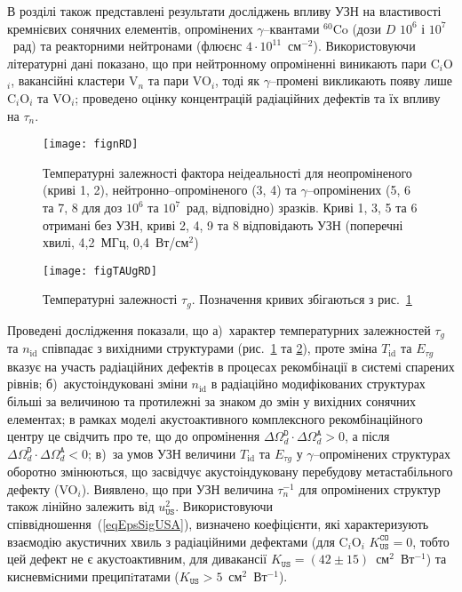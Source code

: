 В розділі також представлені результати досліджень впливу УЗН на властивості кремнієвих сонячних елементів,
опромінених $\gamma$--квантами $^{60}$Co (дози $D$ $10^6$ і $10^7$~рад) та реакторними нейтронами (флюєнс $4\cdot10^{11}$~см$^{-2}$).
Використовуючи літературні дані показано, що при нейтронному опроміненні виникають пари C$_i$O$_i$,
вакансійні кластери V$_n$ та пари VO$_i$, тоді як $\gamma$--промені викликають появу лише C$_i$O$_i$ та VO$_i$;
проведено оцінку концентрацій радіаційних дефектів та їх впливу на $\tau_n$.

\begin{figure}[ht]
\center
\texttt{[image: fignRD]}%
\caption{\label{fignRD}
Температурні залежності фактора неідеальності
для неопроміненого (криві 1, 2),
нейтронно--опроміненого (3, 4) та
$\gamma$--опромінених (5, 6 та 7, 8 для доз $10^6$ та $10^7$~рад, відповідно)
зразків.
Криві 1, 3, 5 та 6 отримані без УЗН,
криві 2, 4, 9 та 8 відповідають УЗН (поперечні хвилі, 4,2~МГц, 0,4~Вт/см$^2$)
}%
\end{figure}


\begin{figure}[ht]
\center
\texttt{[image: figTAUgRD]}%
\caption{\label{figTAUgRD}
Температурні залежності $\tau_g$.
Позначення кривих збігаються з рис.~\ref{fignRD}
}%
\end{figure}

Проведені дослідження показали, що
а)~характер температурних залежностей  $\tau_{g}$ та $n_\mathrm{id}$ співпадає з вихідними структурами (рис.~\ref{fignRD} та \ref{figTAUgRD}), проте зміна $T_{\mathrm{id}}$ та $E_{\tau g}$ вказує на участь радіаційних дефектів в процесах рекомбінації в системі спарених рівнів;
б)~акустоіндуковані зміни $n_\mathrm{id}$ в радіаційно модифікованих структурах більші за величиною та протилежні за знаком до змін у вихідних сонячних елементах;
в рамках моделі акустоактивного комплексного рекомбінаційного центру це свідчить про те, що до опромінення $\Delta\Omega_d^\mathtt{D}\cdot\Delta\Omega_d^\mathtt{A}>0$, а після $\Delta\Omega_d^\mathtt{D}\cdot\Delta\Omega_d^\mathtt{A}<0$;
в)~за умов УЗН величини $T_{\mathrm{id}}$ та $E_{\tau g}$ у $\gamma$--опромінених структурах оборотно змінюються,
що засвідчує акустоіндуковану перебудову метастабільного дефекту (VO$_i$).
Виявлено, що при УЗН величина $\tau_n^{-1}$ для опромінених структур також лінійно залежить від $u_{\mathtt{US}}^2$.
Використовуючи співвідношення~(\ref{eqEpsSigUSA}), визначено коефіцієнти, які характеризують взаємодію акустичних хвиль з радіаційними дефектами (для C$_i$O$_i$ $K_\mathtt{US}^\mathtt{CO}=0$, тобто цей дефект не є акустоактивним,
для дивакансії $K_\mathtt{US}=(42\pm15)$~см$^2$~Вт$^{-1}$)
та кисневмiсними преципiтатами ($K_\mathtt{US}>5$~см$^2$~Вт$^{-1}$).

